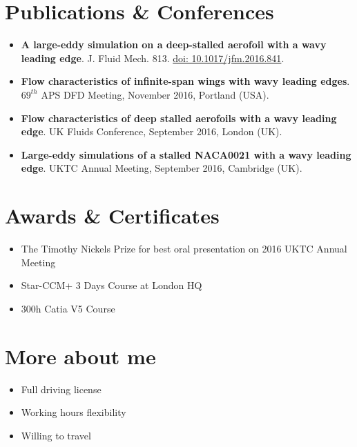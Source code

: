\documentclass[fontsize=10pt]{tccv}
\begin{document}
\vspace{-25pt}
\section{Publications \& Conferences} 
  	\begin{itemize}
	\itemsep -2pt
\item \textbf{A large-eddy simulation on a deep-stalled aerofoil with a wavy leading edge}. J. Fluid Mech. 813. \href{https://doi.org/10.1017/jfm.2016.841}{doi: 10.1017/jfm.2016.841}.
\item \textbf{Flow characteristics of infinite-span wings with wavy leading edges}. $69^{th}$ APS DFD Meeting, November 2016, Portland (USA). 
\item \textbf{Flow characteristics of deep stalled aerofoils with a wavy
leading edge}. UK Fluids Conference, September 2016, London (UK). 
\item \textbf{Large-eddy simulations of a stalled NACA0021 with a wavy
leading edge}. UKTC Annual Meeting, September 2016, Cambridge (UK).
	\end{itemize}

\vspace{-25pt}
\section{Awards \& Certificates} 
  	\begin{itemize}
	\itemsep -2pt
	\item The Timothy Nickels Prize for best oral presentation on 2016 UKTC Annual Meeting
	\item Star-CCM+ 3 Days Course at London HQ
	\item 300h Catia V5 Course
	\end{itemize}

\vspace{-22pt}
\section{More about me} 
\begin{itemize}
	\itemsep -2pt
	\item Full driving license
	\item Working hours flexibility
	\item Willing to travel
\end{itemize}
\end{document}
